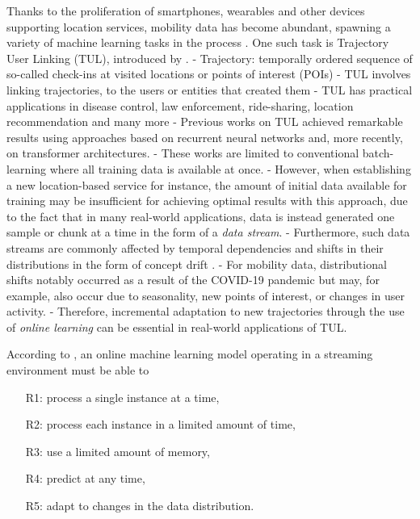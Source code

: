 \documentclass{article} %
\theoremstyle{definition}
\begin{document}
Thanks to the proliferation of smartphones, wearables and other devices supporting location services, mobility data has become abundant, spawning a variety of machine learning tasks in the process \citep{rehmanMiningPersonalData2015,zhengTrajectoryDataMining2015}.
One such task is Trajectory User Linking (TUL), introduced by \citet{gaoIdentifyingHumanMobility2017}.
- Trajectory: temporally ordered sequence of so-called check-ins at visited locations or points of interest (POIs)
- TUL involves linking trajectories, to the users or entities that created them \citep{gaoIdentifyingHumanMobility2017}
- TUL has practical applications in disease control, law enforcement, ride-sharing, location recommendation and many more \citep{haoUnderstandingUrbanPandemic2020,gaoIdentifyingHumanMobility2017}
- Previous works on TUL achieved remarkable results using approaches based on recurrent neural networks and, more recently, on transformer architectures.
- These works are limited to conventional batch-learning where all training data is available at once.
- However, when establishing a new location-based service for instance, the amount of initial data available for training may be insufficient for achieving optimal results with this approach, due to the fact that in many real-world applications, data is instead generated one sample or chunk at a time in the form of a \textit{data stream}.
- Furthermore, such data streams are commonly affected by temporal dependencies and shifts in their distributions in the form of concept drift \citep{gomesSurveyEnsembleLearning2017}.
- For mobility data, distributional shifts notably occurred as a result of the COVID-19 pandemic \citep{borkowskiLockdownedEverydayMobility2021} but may, for example, also occur due to seasonality, new points of interest, or changes in user activity.
- Therefore, incremental adaptation to new trajectories through the use of \textit{online learning} can be essential in real-world applications of TUL.

According to \citet{bifetMOAMassiveOnline2010}, an online machine learning model operating in a streaming environment must be able to
\begin{enumerate}
    \item[R1:] process a single instance at a time,\label{rq:single_instance}
    \item[R2:] process each instance in a limited amount of time,\label{rq:limited_time}
    \item[R3:] use a limited amount of memory,\label{rq:limited_memory}
    \item[R4:] predict at any time,\label{rq:predict_any_time}
    \item[R5:] adapt to changes in the data distribution.\label{rq:adapt_to_drift}
\end{enumerate}
\end{document}
